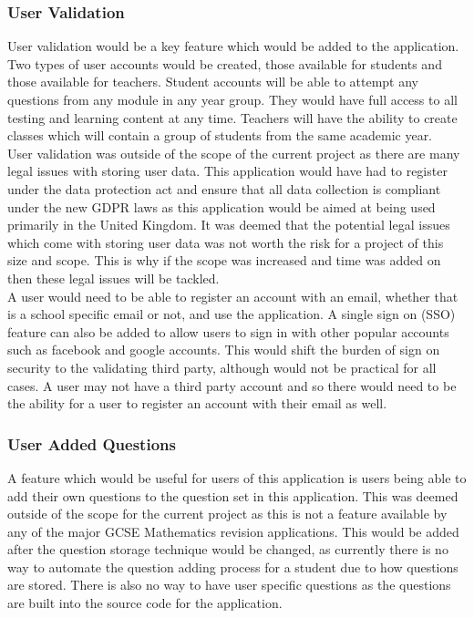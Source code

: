 \documentclass{article}
\begin{document}
\subsubsection{User Validation}

User validation would be a key feature which would be added to the application. Two types of user accounts would be created, those available for students and those available for teachers. Student accounts will be able to attempt any questions from any module in any year group. They would have full access to all testing and learning content at any time. Teachers will have the ability to create classes which will contain a group of students from the same academic year. \\

User validation was outside of the scope of the current project as there are many legal issues with storing user data. This application would have had to register under the data protection act and ensure that all data collection is compliant under the new GDPR laws as this application would be aimed at being used primarily in the United Kingdom. It was deemed that the potential legal issues which come with storing user data was not worth the risk for a project of this size and scope. This is why if the scope was increased and time was added on then these legal issues will be tackled. \\

A user would need to be able to register an account with an email, whether that is a school specific email or not, and use the application. A single sign on (SSO) feature can also be added to allow users to sign in with other popular accounts such as facebook and google accounts. This would shift the burden of sign on security to the validating third party, although would not be practical for all cases. A user may not have a third party account and so there would need to be the ability for a user to register an account with their email as well. \\

\subsubsection{User Added Questions}

A feature which would be useful for users of this application is users being able to add their own questions to the question set in this application. This was deemed outside of the scope for the current project as this is not a feature available by any of the major GCSE Mathematics revision applications. This would be added after the question storage technique would be changed, as currently there is no way to automate the question adding process for a student due to how questions are stored. There is also no way to have user specific questions as the questions are built into the source code for the application. \\
\end{document}

